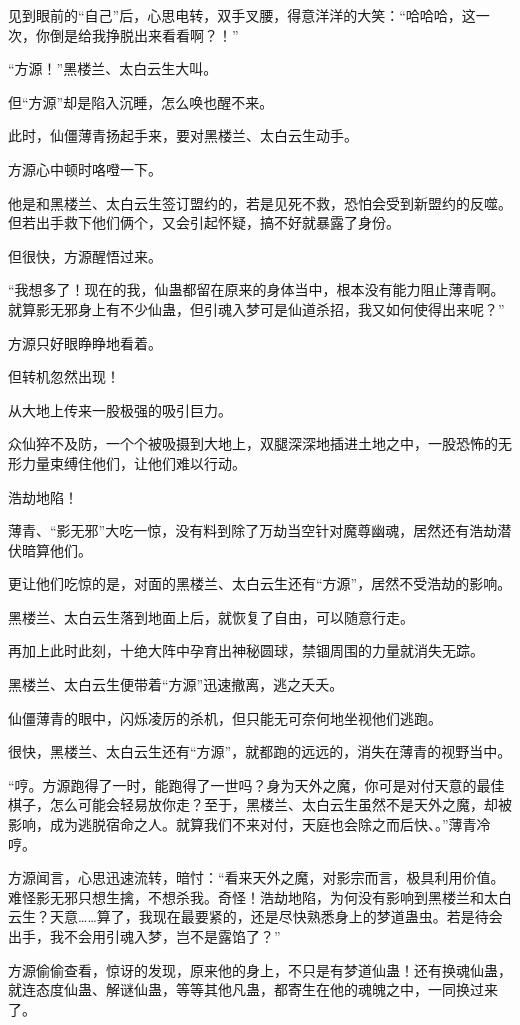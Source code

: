 \begin{this_body}
见到眼前的“自己”后，心思电转，双手叉腰，得意洋洋的大笑：“哈哈哈，这一次，你倒是给我挣脱出来看看啊？！”

“方源！”黑楼兰、太白云生大叫。

但“方源”却是陷入沉睡，怎么唤也醒不来。

此时，仙僵薄青扬起手来，要对黑楼兰、太白云生动手。

方源心中顿时咯噔一下。

他是和黑楼兰、太白云生签订盟约的，若是见死不救，恐怕会受到新盟约的反噬。但若出手救下他们俩个，又会引起怀疑，搞不好就暴露了身份。

但很快，方源醒悟过来。

“我想多了！现在的我，仙蛊都留在原来的身体当中，根本没有能力阻止薄青啊。就算影无邪身上有不少仙蛊，但引魂入梦可是仙道杀招，我又如何使得出来呢？”

方源只好眼睁睁地看着。

但转机忽然出现！

从大地上传来一股极强的吸引巨力。

众仙猝不及防，一个个被吸摄到大地上，双腿深深地插进土地之中，一股恐怖的无形力量束缚住他们，让他们难以行动。

浩劫地陷！

薄青、“影无邪”大吃一惊，没有料到除了万劫当空针对魔尊幽魂，居然还有浩劫潜伏暗算他们。

更让他们吃惊的是，对面的黑楼兰、太白云生还有“方源”，居然不受浩劫的影响。

黑楼兰、太白云生落到地面上后，就恢复了自由，可以随意行走。

再加上此时此刻，十绝大阵中孕育出神秘圆球，禁锢周围的力量就消失无踪。

黑楼兰、太白云生便带着“方源”迅速撤离，逃之夭夭。

仙僵薄青的眼中，闪烁凌厉的杀机，但只能无可奈何地坐视他们逃跑。

很快，黑楼兰、太白云生还有“方源”，就都跑的远远的，消失在薄青的视野当中。

“哼。方源跑得了一时，能跑得了一世吗？身为天外之魔，你可是对付天意的最佳棋子，怎么可能会轻易放你走？至于，黑楼兰、太白云生虽然不是天外之魔，却被影响，成为逃脱宿命之人。就算我们不来对付，天庭也会除之而后快、。”薄青冷哼。

方源闻言，心思迅速流转，暗忖：“看来天外之魔，对影宗而言，极具利用价值。难怪影无邪只想生擒，不想杀我。奇怪！浩劫地陷，为何没有影响到黑楼兰和太白云生？天意……算了，我现在最要紧的，还是尽快熟悉身上的梦道蛊虫。若是待会出手，我不会用引魂入梦，岂不是露馅了？”

方源偷偷查看，惊讶的发现，原来他的身上，不只是有梦道仙蛊！还有换魂仙蛊，就连态度仙蛊、解谜仙蛊，等等其他凡蛊，都寄生在他的魂魄之中，一同换过来了。


\end{this_body}
